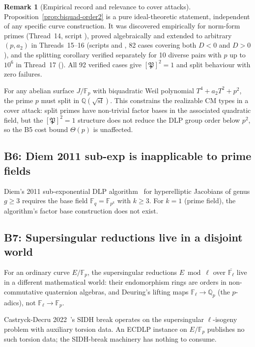 \documentclass[11pt,a4paper]{article}
\theoremstyle{definition}
\newtheorem{remark}[theorem]{Remark}
\newcommand{\FF}{\mathbb{F}}
\newcommand{\QQ}{\mathbb{Q}}
\begin{document}
\begin{remark}[Empirical record and relevance to cover attacks]
\label{rem:biquad-splitting}
Proposition~\ref{prop:biquad-order2} is a pure ideal-theoretic statement,
independent of any specific curve construction.
It was discovered empirically for norm-form primes
(Thread~14, script ),
proved algebraically and extended to arbitrary $(p,a_2)$
in Threads~15--16 (scripts  and
, 82 cases covering both $D < 0$
and $D > 0$), and the splitting corollary verified separately for 10 diverse pairs
with $p$ up to $10^6$ in Thread~17 ().
All 92 verified cases give $[\mathfrak{P}]^2 = 1$ and split behaviour with zero failures.

For any abelian surface $J/\FF_p$ with biquadratic Weil polynomial
$T^4 + a_2 T^2 + p^2$, the prime $p$ must split in $\QQ(\sqrt{\mathrm{sf}})$.
This constrains the realizable CM types in a cover attack: split primes have
non-trivial factor bases in the associated quadratic field, but the
$[\mathfrak{P}]^2 = 1$ structure does not reduce the DLP group order below $p^2$,
so the B5 cost bound $\Theta(p)$ is unaffected.
\end{remark}

\subsection*{B6: Diem 2011 sub-exp is inapplicable to prime fields}

Diem's 2011 sub-exponential DLP algorithm~\cite{diem2011} for
hyperelliptic Jacobians of genus $g \geq 3$ requires the base field
$\FF_q = \FF_{p^k}$ with $k \geq 3$. For $k = 1$ (prime field), the
algorithm's factor base construction does not exist.

\subsection*{B7: Supersingular reductions live in a disjoint world}

For an ordinary curve $E/\FF_p$, the supersingular reductions
$E \bmod \ell$ over $\overline{\FF_\ell}$ live in a different
mathematical world: their endomorphism rings are orders in
non-commutative quaternion algebras, and Deuring's lifting maps
$\FF_\ell \to \QQ_p$ (the $p$-adics), not $\FF_\ell \to \FF_p$.

Castryck-Decru 2022~\cite{castryckdecru2023}'s SIDH break operates
on the supersingular $\ell$-isogeny problem with auxiliary torsion
data. An ECDLP instance on $E/\FF_p$ publishes no such torsion
data; the SIDH-break machinery has nothing to consume.
\end{document}
